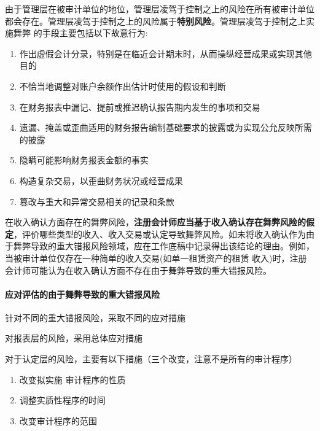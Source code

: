 \documentclass[UTF8,12pt]{ctexart}
\numberwithin{equation}{section} %
\numberwithin{figure}{section}
\numberwithin{table}{section}
\begin{document}
	由于管理层在被审计单位的地位，管理层凌驾于控制之上的风险在所有被审计单位都会存在。管理层凌驾于控制之上的风险属于\textbf{特别风险}。管理层凌驾于控制之上实施舞弊 的手段主要包括以下故意行为:
	\begin{enumerate}
		\item 作出虚假会计分录，特别是在临近会计期末时，从而操纵经营成果或实现其他目的
		
		\item 不恰当地调整对账户余额作出估计时使用的假设和判断
		
		\item 在财务报表中漏记、提前或推迟确认报告期内发生的事项和交易
		
		\item 遗漏、掩盖或歪曲适用的财务报告编制基础要求的披露或为实现公允反映所需的披露
		
		\item 隐瞒可能影响财务报表金额的事实
		
		\item 构造复杂交易，以歪曲财务状况或经营成果
		
		\item 篡改与重大和异常交易相关的记录和条款
	\end{enumerate}
	
	在收入确认方面存在的舞弊风险，\textbf{注册会计师应当基于收入确认存在舞弊风险的假定}，评价哪些类型的收入、收入交易或认定导致舞弊风险。如未将收入确认作为由于舞弊导致的重大错报风险领域，应在工作底稿中记录得出该结论的理由。例如，当被审计单位仅存在一种简单的收入交易(如单一租赁资产的租赁 收入)时，注册会计师可能认为在收入确认方面不存在由于舞弊导致的重大错报风险。
	
	\paragraph{应对评估的由于舞弊导致的重大错报风险}
	针对不同的重大错报风险，采取不同的应对措施
	
	对报表层的风险，采用总体应对措施
	
	对于认定层的风险，主要有以下措施（三个改变，注意不是所有的审计程序）
	\begin{enumerate}
		\item 改变拟实施 审计程序的性质
		
		\item 调整实质性程序的时间
		
		\item 改变审计程序的范围
	\end{enumerate}
	
\end{document}
